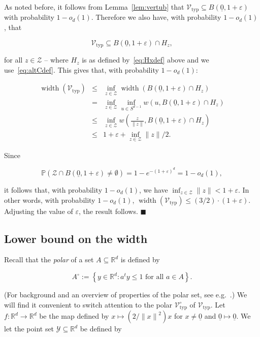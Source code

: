 \documentclass[11pt]{article}%
\newenvironment{proof}{\vspace{1ex}\noindent{\bf Proof.}}{\hspace*{\fill}$\blacksquare$\vspace{1ex}}
\newcommand{\Vcal}[0]{\ensuremath{{\mathcal V}}}
\newcommand{\Ycal}[0]{\ensuremath{{\mathcal Y}}}
\newcommand{\Zcal}[0]{\ensuremath{{\mathcal Z}}}
\newcommand{\eR}[0]{\ensuremath{ \mathbb R}}
\newcommand{\norm}[1]{\ensuremath{\|#1\|}}
\newcommand{\Pee}[0]{\ensuremath{{\mathbb P}}}
\newcommand{\eps}{\varepsilon}
\newcommand{\orig}{\underline{0}}
\DeclareMathOperator{\width}{width}
\newcommand{\Vtyp}[0]{\Vcal_{\text{typ}}}
\begin{document}
\begin{proof}
As noted before, it follows from Lemma~\ref{lem:vertub} that $\Vtyp \subseteq B(\orig,1+\eps)$ with 
probability $1-o_d(1)$.
Therefore we also have, with probability $1-o_d(1)$, that 

$$ \Vtyp \subseteq B(\orig,1+\eps) \cap H_z, $$

\noindent
for all $z \in \Zcal$ -- where $H_z$ is as defined by~\eqref{eq:Hxdef} above and we use~\eqref{eq:altCdef}. 
This gives that, with probability $1-o_d(1)$:

$$ \begin{array}{rcl} 
\width(\Vtyp) 
& \leq & \displaystyle 
\inf_{z\in\Zcal}  \width( B(\orig,1+\eps) \cap H_z ) \\[2ex]
& = & \displaystyle
\inf_{z\in\Zcal}\inf_{u\in S^{d-1}} w( u, B(\orig,1+\eps) \cap H_z ) \\[2ex]
& \leq & \displaystyle 
\inf_{z\in\Zcal} w\left(\frac{z}{\norm{z}}, B(\orig,1+\eps) \cap H_z \right) \\[2ex]
& \leq & \displaystyle 
1+\eps + \inf_{z\in\Zcal} \norm{z}/2. 
\end{array} $$

\noindent 
Since 

$$ \Pee( \Zcal \cap B(\orig,1+\eps) \neq \emptyset ) = 1 - e^{-(1+\eps)^d}  = 1 - o_d(1), $$

\noindent
it follows that, with probability $1-o_d(1)$, we have $\inf_{z\in\Zcal} \norm{z} < 1+\eps$.
In other words, with probability $1-o_d(1)$, $\width(\Vtyp) \leq (3/2)\cdot (1+\eps)$.
Adjusting the value of $\eps$, the result follows.
\end{proof}



\subsection{Lower bound on the width}



Recall that the {\em polar} of a set $A \subseteq \eR^d$ is defined by 

$$ A^{\circ} := \left\{ y \in \eR^d : a^t y \leq 1 \text{ for all } a \in A \right\}. $$

\noindent
(For background and an overview of properties of the polar set, see e.g.~\cite{Bronsted}.)
We will find it convenient to switch attention to the polar $\Vtyp^{\circ}$ of $\Vtyp$.
Let $f : \eR^d \to \eR^d$ be the map defined by $x \mapsto (2/\norm{x}^2) x$ for $x\neq\orig$ and
$\orig\mapsto\orig$.
We let the point set $\Ycal \subseteq \eR^d$ be defined by
\end{document}
